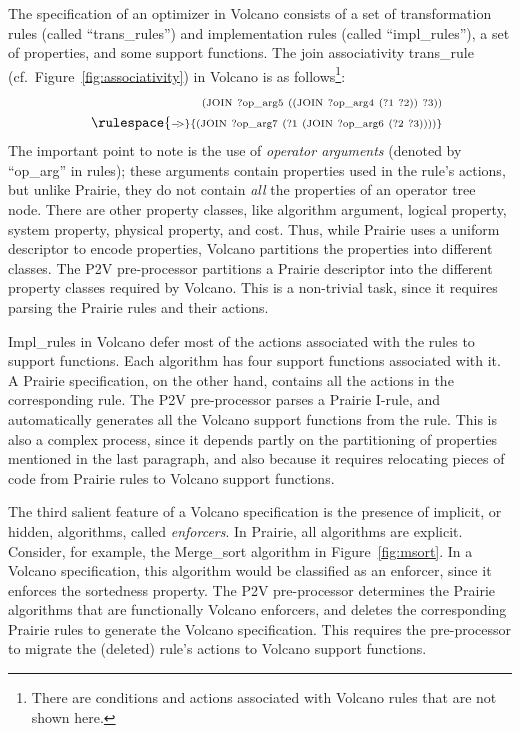 The specification of an optimizer in Volcano consists of a set of
transformation rules (called ``trans\_rules'') and implementation rules
(called ``impl\_rules''), a set of properties, and some support
functions.  The join associativity trans\_rule
(cf.\ Figure~\ref{fig:associativity}) in Volcano is as follows\footnote{There
are conditions and actions associated with Volcano rules that are not
shown here.}:
\begin{eqnarray*}
\scriptscriptstyle
& &
{\scriptstyle
(\text{JOIN} \ \text{?op\_arg5}
  \ ((\text{JOIN} \ \text{?op\_arg4} \ (?1 \ ?2)) \ 
     ?3))} \\
& &
\rulespace
{\scriptstyle -\!\!>}
{\scriptstyle
(\text{JOIN} \ \text{?op\_arg7}
  \ (?1 \ 
     (\text{JOIN} \ \text{?op\_arg6} \ (?2 \ ?3))))}
\end{eqnarray*}
The important point to note is the use of \emph{operator arguments}
(denoted by ``op\_arg'' in rules); these arguments contain properties
used in the rule's actions, but unlike Prairie, they do not contain
\emph{all} the properties of an operator tree node.  There are other
property classes, like algorithm argument, logical property, system
property, physical property, and cost.  Thus, while Prairie uses a
uniform descriptor to encode properties, Volcano partitions the
properties into different classes.  The P2V pre-processor partitions a
Prairie descriptor into the different property classes required by
Volcano.  This is a non-trivial task, since it requires parsing the
Prairie rules and their actions.

Impl\_rules in Volcano defer most of the actions associated with the
rules to support functions.  Each algorithm has four support functions
associated with it.  A Prairie specification, on the other hand,
contains all the actions in the corresponding rule.  The P2V
pre-processor parses a Prairie I-rule, and automatically generates all
the Volcano support functions from the rule.  This is also a complex
process, since it depends partly on the partitioning of properties
mentioned in the last paragraph, and also because it requires
relocating pieces of code from Prairie rules to Volcano support
functions.

The third salient feature of a Volcano specification is the presence of
implicit, or hidden, algorithms, called \emph{enforcers}.  In Prairie,
all algorithms are explicit.  Consider, for example, the Merge\_sort
algorithm in Figure~\ref{fig:msort}.  In a Volcano specification, this
algorithm would be classified as an enforcer, since it enforces the
sortedness property.  The P2V pre-processor determines the Prairie
algorithms that are functionally Volcano enforcers, and deletes the
corresponding Prairie rules to generate the Volcano specification.
This requires the pre-processor to migrate the (deleted) rule's actions
to Volcano support functions.

